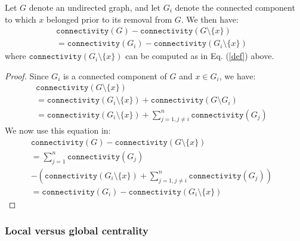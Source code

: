 \begin{proposition}
Let $G$ denote an undirected graph, and let $G_i$ denote the connected component to which $x$ belonged prior to its removal from $G$. We then have:
\begin{equation}
\begin{array}{ll}
\mathtt{connectivity}(G) - \mathtt{connectivity}(G \setminus \{x\}) &\\
= \mathtt{connectivity}(G_i) - \mathtt{connectivity}(G_i \setminus \{x\})
\end{array}
\label{loss}
\end{equation}
where $\mathtt{connectivity}(G_i \setminus \{x\})$ can be computed as in Eq. (\ref{def}) above.
\label{connectivity}
\end{proposition}
\begin{proof}
Since $G_i$ is a connected component of $G$ and $x \in G_i$, we have:
\begin{equation*}
\begin{array}{ll}
\mathtt{connectivity}(G \setminus \{x\})  &  \\
 =  \mathtt{connectivity}(G_i \setminus \{x\}) + \mathtt{connectivity}(G \setminus G_i)&\\
 =  \mathtt{connectivity}(G_i \setminus \{x\}) + \sum_{j = 1, j \neq i}^{n} \mathtt{connectivity}(G_j)&
\end{array}
\end{equation*}
We now use this equation in:
\begin{equation*}
\begin{array}{ll}
\mathtt{connectivity}(G) - \mathtt{connectivity}(G \setminus \{x\})  &  \\
 =  \sum_{j = 1}^{n} \mathtt{connectivity}(G_j) & \\
- \left ( \mathtt{connectivity}(G_i \setminus \{x\}) + \sum_{j = 1, j \neq i}^{n} \mathtt{connectivity}(G_j)\right)& \\
 =  \mathtt{connectivity}(G_i) - \mathtt{connectivity}(G_i \setminus \{x\}) 
\end{array}
\end{equation*}
\end{proof}

\subsubsection{Local versus global centrality}

